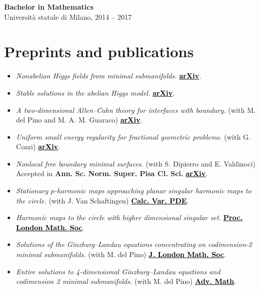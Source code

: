 \documentclass[a4paper,11pt]{article}
\newcommand{\changed}[1]{#1}
\newcommand{\blackhref}[2]{\href{#1}{\textcolor{black}{#2}}}
\begin{document}
\textbf{Bachelor in Mathematics} \\
Università statale di Milano, 2014 -- 2017

\vspace{5mm}

\section*{Preprints and publications}
\noindent
\begin{itemize}
    \item \emph{Nonabelian Higgs fields from minimal submanifolds.} \blackhref{https://arxiv.org/abs/2610.35837}{\textbf{arXiv}}.
    \item \changed{\emph{Stable solutions in the abelian Higgs model.} \blackhref{https://arxiv.org/abs/2609.11647}{\textbf{arXiv}}.}
    \item \changed{\emph{A two-dimensional Allen--Cahn theory for interfaces with boundary.} (with M. del Pino and M. A. M. Guaraco) \blackhref{https://arxiv.org/abs/2607.29588}{\textbf{arXiv}}.}
    \item \changed{\emph{Uniform small energy regularity for fractional geometric problems.} (with G. Cozzi) \blackhref{https://arxiv.org/abs/2605.06128}{\textbf{arXiv}}.}
    \item \emph{Nonlocal free boundary minimal surfaces.} (with S. Dipierro and E. Valdinoci) Accepted in \textbf{Ann. Sc. Norm. Super. Pisa Cl. Sci.} \blackhref{https://arxiv.org/abs/2508.00337}{\textbf{arXiv}}.
    \item \emph{Stationary $p$-harmonic maps approaching planar singular harmonic maps to the circle.} (with J. Van Schaftingen) \blackhref{https://link.springer.com/article/10.1007/s00526-025-03160-w}{\textbf{Calc. Var. PDE}}.
    \item \changed{\emph{Harmonic maps to the circle with higher dimensional singular set.} \blackhref{https://londmathsoc.onlinelibrary.wiley.com/doi/10.1112/plms.70135}{\textbf{Proc. London Math. Soc}}.}
    \item \emph{Solutions of the Ginzburg--Landau equations concentrating on codimension-2 minimal submanifolds.} (with M. del Pino) \blackhref{https://londmathsoc.onlinelibrary.wiley.com/doi/10.1112/jlms.12851}{\textbf{J. London Math. Soc}}.
    \item \emph{Entire solutions to 4-dimensional Ginzburg--Landau equations and codimension 2 minimal submanifolds.} (with M. del Pino) \blackhref{https://www.sciencedirect.com/science/article/pii/S000187082300508X}{\textbf{Adv. Math}}.
\end{itemize}
\end{document}
